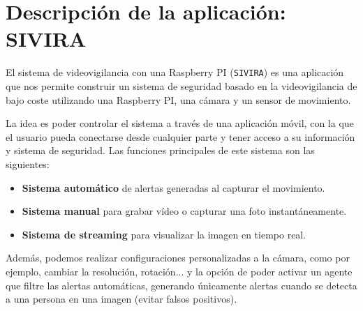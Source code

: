 


\pagestyle{miEstilo5}

\section{Descripción de la aplicación: SIVIRA}

El sistema de videovigilancia con una Raspberry PI (\texttt{SIVIRA}) es una aplicación que nos permite construir un sistema de seguridad basado en la videovigilancia de bajo coste utilizando una Raspberry PI, una cámara y un sensor de movimiento.

La idea es poder controlar el sistema a través de una aplicación móvil, con la que el usuario pueda conectarse desde cualquier parte y tener acceso a su información y sistema de seguridad. Las funciones principales de este sistema son las siguientes:

\begin{itemize}
\item \textbf{Sistema automático} de alertas generadas al capturar el movimiento.
\item \textbf{Sistema manual} para grabar vídeo o capturar una foto instantáneamente.   
\item \textbf{Sistema de streaming} para visualizar la imagen en tiempo real.
\end{itemize}

Además, podemos realizar configuraciones personalizadas a la cámara, como por ejemplo, cambiar la resolución, rotación... y la opción de poder activar un agente que filtre las alertas automáticas, generando únicamente alertas cuando se detecta a una persona en una imagen (evitar falsos positivos).







\newpage





